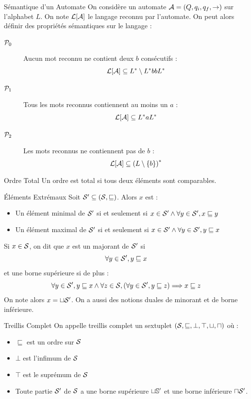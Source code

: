 \documentclass{cours}
\begin{document}
\begin{propositionfr}{Sémantique d'un Automate}{}
	On considère un automate $\A = \left(Q, q_{i}, q_{f}, \rightarrow\right)$ sur l'alphabet $L$. On note $\mL[\A]$ le langage reconnu par l'automate. On peut alors définir des propriétés sémantiques sur le langage :
	\begin{description}
		\item[$\mP_{0}$] Aucun mot reconnu ne contient deux $b$ consécutifs : \[\mL[\A] \subseteq L^{*}\setminus L^{*}bbL^{*}\]
		\item[$\mP_{1}$] Tous les mots reconnus contiennent au moins un $a$ : \[\mL[\A] \subseteq L^{*}aL^{*}\]
		\item[$\mP_{2}$] Les mots reconnus ne contiennent pas de $b$ : \[\mL[\A] \subseteq \left(L \setminus \{b\}\right)^{*}\]
	\end{description}
\end{propositionfr}

\begin{définition}{Ordre Total}{}
Un ordre est total si tous deux éléments sont comparables.
\end{définition}

\begin{définition}{Éléments Extrémaux}{}
Soit $\mS' \subseteq \left(\mS, \sqsubseteq\right)$. Alors $x$ est :
\begin{itemize}
	\item Un élément minimal de $\mS'$ si et seulement si $x \in \mS' \land \forall y \in \mS', x \sqsubseteq y$
	\item Un élément maximal de $\mS'$ si et seulement si $x \in \mS' \land \forall y \in \mS', y \sqsubseteq x$
\end{itemize}
Si $x \in \mS$, on dit que $x$ est un majorant de $\mS'$ si
\[
	\forall y \in \mS', y\sqsubseteq x
\]
et une borne supérieure si de plus :
\[
	\forall y \in \mS', y \sqsubseteq x \land \forall z \in \mS, \left(\forall y \in \mS', y \sqsubseteq z\right) \Longrightarrow x \sqsubseteq z
\]
On note alors $x = \sqcup \mS'$.
On a aussi des notions duales de minorant et de borne inférieure.
\end{définition}

\begin{définition}{Treillis Complet}{}
On appelle treillis complet un sextuplet $\left(\mS, \sqsubseteq, \bot, \top,\sqcup, \sqcap\right)$ où :
\begin{itemize}
	\item $\sqsubseteq$ est un ordre sur $\mS$
	\item $\bot$ est l'infimum de $\mS$
	\item $\top$ est le suprémum de $\mS$
	\item Toute partie $\mS'$ de $\mS$ a une borne supérieure $\sqcup \S'$ et une borne inférieure $\sqcap \mS'$.
\end{itemize}
\end{définition}
\end{document}
